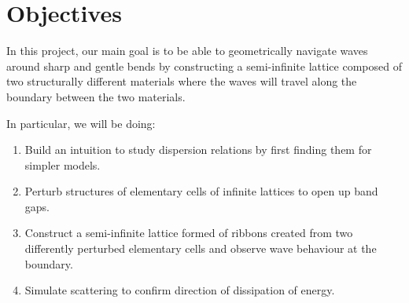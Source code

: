 \section{Objectives}
In this project, our main goal is to be able to geometrically navigate waves
around sharp and gentle bends by constructing a semi-infinite lattice composed
of two structurally different materials where the waves will travel along the
boundary between the two materials.

In particular, we will be doing:

\begin{enumerate}
\item Build an intuition to study dispersion relations by first finding them
      for simpler models.
\item Perturb structures of elementary cells of infinite lattices to open up
      band gaps.
\item Construct a semi-infinite lattice formed of ribbons created from two
      differently perturbed elementary cells and observe wave behaviour at the
      boundary.
\item Simulate scattering to confirm direction of dissipation of energy.
\end{enumerate}


